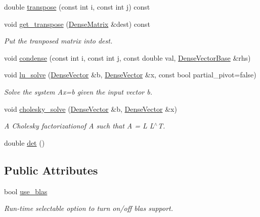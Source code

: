 \begin{DoxyCompactItemize}
double \mbox{\hyperlink{classfemus_1_1_dense_matrix_a66f15cb283425507fcf2883394d18086}{transpose}} (const int i, const int j) const
\item 
void \mbox{\hyperlink{classfemus_1_1_dense_matrix_af8801bd9d1a335fc3a820f95128a46cf}{get\+\_\+transpose}} (\mbox{\hyperlink{classfemus_1_1_dense_matrix}{Dense\+Matrix}} \&dest) const
\begin{DoxyCompactList}\small\item\em Put the tranposed matrix into {\ttfamily dest}. \end{DoxyCompactList}\item 
void \mbox{\hyperlink{classfemus_1_1_dense_matrix_a2b0e9e0b07db7eb9e3aff9067e2b4fd6}{condense}} (const int i, const int j, const double val, \mbox{\hyperlink{classfemus_1_1_dense_vector_base}{Dense\+Vector\+Base}} \&rhs)
\item 
void \mbox{\hyperlink{classfemus_1_1_dense_matrix_a3225f4b8647222c03a03cd35b54e7d93}{lu\+\_\+solve}} (\mbox{\hyperlink{classfemus_1_1_dense_vector}{Dense\+Vector}} \&b, \mbox{\hyperlink{classfemus_1_1_dense_vector}{Dense\+Vector}} \&x, const bool partial\+\_\+pivot=false)
\begin{DoxyCompactList}\small\item\em Solve the system Ax=b given the input vector b. \end{DoxyCompactList}\item 
void \mbox{\hyperlink{classfemus_1_1_dense_matrix_aa21f4ae4b7277cf63799fad573382c9b}{cholesky\+\_\+solve}} (\mbox{\hyperlink{classfemus_1_1_dense_vector}{Dense\+Vector}} \&b, \mbox{\hyperlink{classfemus_1_1_dense_vector}{Dense\+Vector}} \&x)
\begin{DoxyCompactList}\small\item\em A Cholesky factorizationof A such that A = L L$^\wedge$T. \end{DoxyCompactList}\item 
double \mbox{\hyperlink{classfemus_1_1_dense_matrix_a752a0289f98f7182c72b7c08cd49062c}{det}} ()
\end{DoxyCompactItemize}
\subsection*{Public Attributes}
\begin{DoxyCompactItemize}
\item 
bool \mbox{\hyperlink{classfemus_1_1_dense_matrix_a1f4f9cac8bd3c8b9ff1514c0b4ffedc6}{use\+\_\+blas}}
\begin{DoxyCompactList}\small\item\em Run-\/time selectable option to turn on/off blas support. \end{DoxyCompactList}\end{DoxyCompactItemize}
